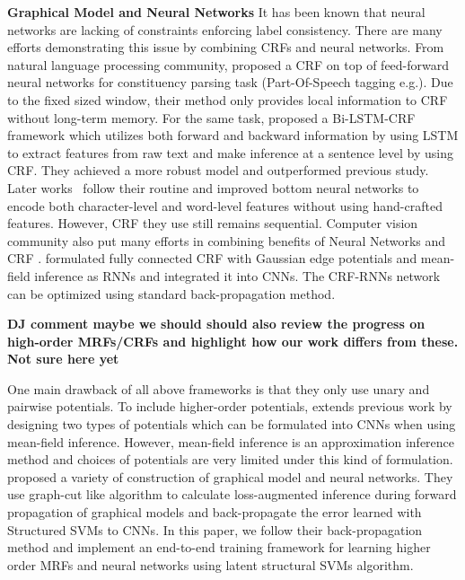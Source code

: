 \documentclass[sigconf, anonymous, review]{acmart}
\renewcommand{\citename}{\citet}
\renewcommand{\cite}{\citep}
\begin{document}
\textbf{Graphical Model and Neural Networks} It has been known
that neural networks are lacking of constraints enforcing label
consistency. There are many efforts demonstrating this issue by
combining CRFs and neural networks. From natural language
processing community, \citename{collobert2011natural} proposed a
CRF on top of feed-forward neural networks for constituency
parsing task (Part-Of-Speech tagging e.g.). Due to the fixed
sized window, their method only provides local information to CRF
without long-term memory. For the same task,
\citename{huang2015bidirectional} proposed a Bi-LSTM-CRF
framework which utilizes both forward and backward information by
using LSTM to extract features from raw text and make inference
at a sentence level by using CRF. They achieved a more robust
model and outperformed previous study. Later
works~\cite{ma2016end,lample2016neural} follow their routine and
improved bottom neural networks to encode both character-level
and word-level features without using hand-crafted features.
However, CRF they use still remains sequential. Computer vision
community also put many efforts in combining benefits of Neural
Networks and CRF \cite{chen2018deeplab,zheng2015conditional}.
\citename{zheng2015conditional} formulated fully connected CRF
with Gaussian edge potentials and mean-field inference as RNNs
and integrated it into CNNs. The CRF-RNNs network can be
optimized using standard back-propagation method.

\textbf{DJ comment maybe we should should also review the progress on high-order MRFs/CRFs and highlight how our work differs from these. Not sure here yet}

One main drawback of all above frameworks is that they only use
unary and pairwise potentials. To include higher-order
potentials, \citename{arnab2016higher} extends previous work by
designing two types of potentials which can be formulated into
CNNs when using mean-field inference. However, mean-field
inference is an approximation inference method and choices of
potentials are very limited under this kind of formulation.
\citename{witoonchart2017application} proposed a variety of
construction of graphical model and neural networks. They use
graph-cut like algorithm to calculate loss-augmented inference
during forward propagation of graphical models and back-propagate
the error learned with Structured SVMs \cite{Joachims:ML09} to
CNNs. In this paper, we follow their back-propagation method and
implement an end-to-end training framework for learning higher
order MRFs and neural networks using latent structural SVMs
\cite{yu2009learning} algorithm.
\end{document}
